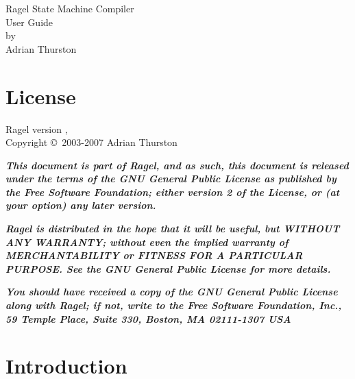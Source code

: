 \documentclass[letterpaper,11pt,oneside]{book}
\begin{document}
%
%
\thispagestyle{empty}
\begin{center}
\vspace*{3in}
{\huge Ragel State Machine Compiler}\\
\vspace*{12pt}
{\Large User Guide}\\
\vspace{1in}
by\\
\vspace{12pt}
{\large Adrian Thurston}\\
\end{center}
\clearpage


%
%
\chapter*{License}
Ragel version \version, \pubdate\\
Copyright \copyright\ 2003-2007 Adrian Thurston
\vspace{6mm}

{\bf\it\noindent This document is part of Ragel, and as such, this document is
released under the terms of the GNU General Public License as published by the
Free Software Foundation; either version 2 of the License, or (at your option)
any later version.}

\vspace{5pt}

{\bf\it\noindent Ragel is distributed in the hope that it will be useful, but
WITHOUT ANY WARRANTY; without even the implied warranty of MERCHANTABILITY or
FITNESS FOR A PARTICULAR PURPOSE.  See the GNU General Public License for more
details.}

\vspace{5pt}

{\bf\it\noindent You should have received a copy of the GNU General Public
License along with Ragel; if not, write to the Free Software Foundation, Inc.,
59 Temple Place, Suite 330, Boston, MA  02111-1307  USA}

%
%
\clearpage
\tableofcontents
\clearpage

%
%


\chapter{Introduction}
\end{document}
